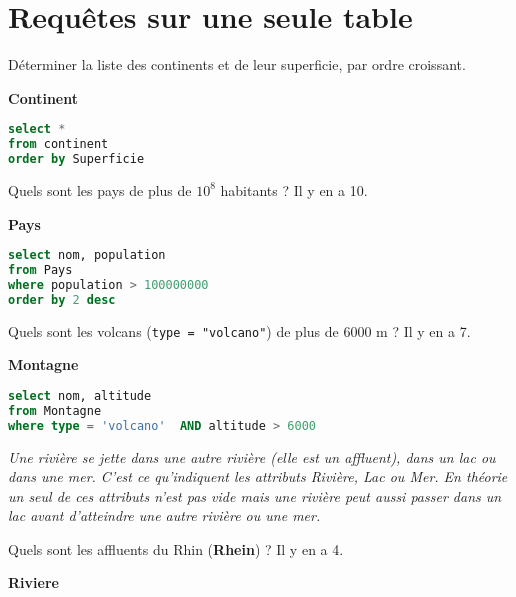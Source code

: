 \section{Requêtes sur une seule table}
\begin{Exercise}
Déterminer la liste des continents et de leur superficie, par ordre croissant.
\end{Exercise}

{\bf Continent} 

\begin{Answer}
\begin{lstlisting}[language=SQL]
select *
from continent
order by Superficie
\end{lstlisting}
\end{Answer}
\begin{Exercise}
Quels sont les pays de plus de $10^8$ habitants ? Il y en a 10.
\end{Exercise}

{\bf Pays}

\begin{Answer}
\begin{lstlisting}[language=SQL]
select nom, population
from Pays
where population > 100000000
order by 2 desc
\end{lstlisting}
\end{Answer}
\begin{Exercise}
Quels sont les volcans ({\tt type = "volcano"}) de plus de 6000 m ? Il y en a 7.
\end{Exercise}

{\bf Montagne}

\begin{Answer}
\begin{lstlisting}[language=SQL]
select nom, altitude
from Montagne 
where type = 'volcano'  AND altitude > 6000
\end{lstlisting}
\end{Answer}
\newpage
{\it Une rivière se jette dans une autre rivière (elle est un affluent), dans un lac ou dans une mer. C'est ce qu'indiquent les attributs {\it Rivière}, {\it Lac} ou {\it Mer}. En théorie un seul de ces attributs n'est pas vide mais une rivière peut aussi passer dans un lac avant d'atteindre une autre rivière ou une mer.}
\begin{Exercise}
Quels sont les affluents du Rhin ({\bf Rhein}) ? Il y en a 4.
\end{Exercise}
{\bf Riviere} 

